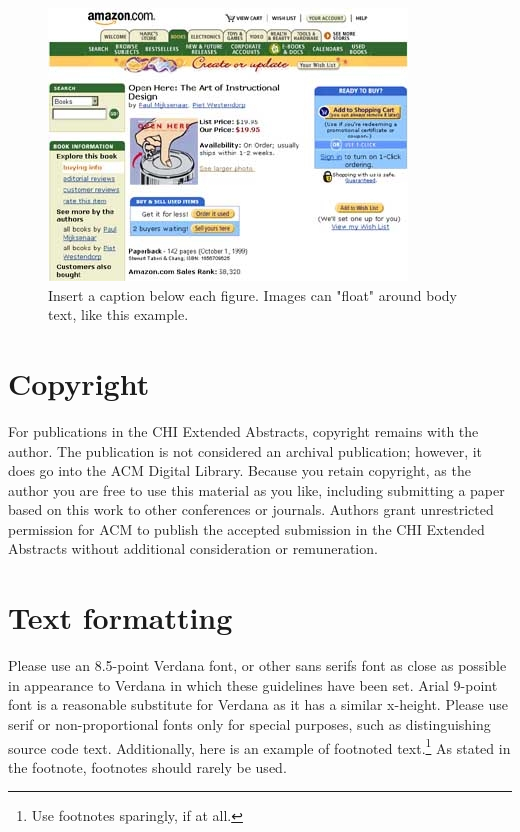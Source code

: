 \documentclass{chi-ext}
\begin{document}
\begin{figure}
\hspace*{-0.4\columnwidth}%
\parbox{1.4\columnwidth}{
  \centering
  \includegraphics[width=\columnwidth]{sample.jpg}
  \caption{Insert a caption below each figure. Images can "float" around body text, like this example.}
  \label{fig:sample}
}
\end{figure}%

\section{Copyright}
For publications in the CHI Extended Abstracts, copyright remains with the author.  
The publication is not considered an archival publication; however, it does go into the ACM Digital Library. 
Because you retain copyright, as the author you are free to use this material as you like, including submitting a paper based on this work to other conferences or journals.  
Authors grant unrestricted permission for ACM to publish the accepted submission in the CHI Extended Abstracts without additional consideration or remuneration.


\section{Text formatting}
Please use an 8.5-point Verdana font, or other sans serifs font as close as possible in appearance to Verdana in which these guidelines have been set. 
Arial 9-point font is a reasonable substitute for Verdana as it has a similar x-height. 
Please use serif or non-proportional fonts only for special purposes, such as distinguishing source code text.
Additionally, here is an example of footnoted text.\footnote{Use footnotes sparingly, if at all.}
As stated in the footnote, footnotes should rarely be used.
\end{document}
